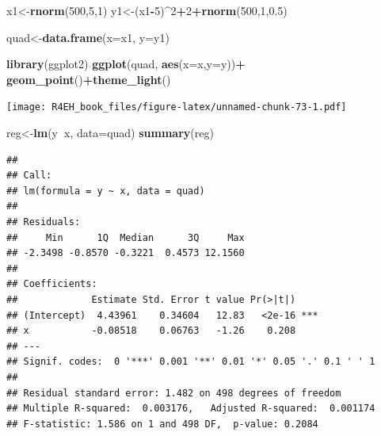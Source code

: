 \documentclass[]{book}
\newenvironment{Shaded}{\begin{snugshade}}{\end{snugshade}}
\newcommand{\KeywordTok}[1]{\textcolor[rgb]{0.13,0.29,0.53}{\textbf{#1}}}
\newcommand{\DataTypeTok}[1]{\textcolor[rgb]{0.13,0.29,0.53}{#1}}
\newcommand{\DecValTok}[1]{\textcolor[rgb]{0.00,0.00,0.81}{#1}}
\newcommand{\FloatTok}[1]{\textcolor[rgb]{0.00,0.00,0.81}{#1}}
\newcommand{\StringTok}[1]{\textcolor[rgb]{0.31,0.60,0.02}{#1}}
\newcommand{\OperatorTok}[1]{\textcolor[rgb]{0.81,0.36,0.00}{\textbf{#1}}}
\newcommand{\NormalTok}[1]{#1}
\theoremstyle{definition}
\theoremstyle{definition}
\theoremstyle{definition}
\theoremstyle{remark}
\begin{document}
\begin{Shaded}
\begin{Highlighting}[]
\NormalTok{x1<-}\KeywordTok{rnorm}\NormalTok{(}\DecValTok{500}\NormalTok{,}\DecValTok{5}\NormalTok{,}\DecValTok{1}\NormalTok{)}
\NormalTok{y1<-(x1}\OperatorTok{-}\DecValTok{5}\NormalTok{)}\OperatorTok{^}\DecValTok{2}\OperatorTok{+}\DecValTok{2}\OperatorTok{+}\KeywordTok{rnorm}\NormalTok{(}\DecValTok{500}\NormalTok{,}\DecValTok{1}\NormalTok{,}\FloatTok{0.5}\NormalTok{)}

\NormalTok{quad<-}\KeywordTok{data.frame}\NormalTok{(}\DataTypeTok{x=}\NormalTok{x1,}
                 \DataTypeTok{y=}\NormalTok{y1)}
\end{Highlighting}
\end{Shaded}

\begin{Shaded}
\begin{Highlighting}[]
\KeywordTok{library}\NormalTok{(ggplot2)}
\KeywordTok{ggplot}\NormalTok{(quad, }\KeywordTok{aes}\NormalTok{(}\DataTypeTok{x=}\NormalTok{x,}\DataTypeTok{y=}\NormalTok{y))}\OperatorTok{+}
\StringTok{  }\KeywordTok{geom_point}\NormalTok{()}\OperatorTok{+}\KeywordTok{theme_light}\NormalTok{()}
\end{Highlighting}
\end{Shaded}

\texttt{[image: R4EH\_book\_files/figure-latex/unnamed-chunk-73-1.pdf]}

\begin{Shaded}
\begin{Highlighting}[]
\NormalTok{reg<-}\KeywordTok{lm}\NormalTok{(y}\OperatorTok{~}\NormalTok{x, }\DataTypeTok{data=}\NormalTok{quad)}
\KeywordTok{summary}\NormalTok{(reg)}
\end{Highlighting}
\end{Shaded}

\begin{verbatim}
## 
## Call:
## lm(formula = y ~ x, data = quad)
## 
## Residuals:
##     Min      1Q  Median      3Q     Max 
## -2.3498 -0.8570 -0.3221  0.4573 12.1560 
## 
## Coefficients:
##             Estimate Std. Error t value Pr(>|t|)    
## (Intercept)  4.43961    0.34604   12.83   <2e-16 ***
## x           -0.08518    0.06763   -1.26    0.208    
## ---
## Signif. codes:  0 '***' 0.001 '**' 0.01 '*' 0.05 '.' 0.1 ' ' 1
## 
## Residual standard error: 1.482 on 498 degrees of freedom
## Multiple R-squared:  0.003176,   Adjusted R-squared:  0.001174 
## F-statistic: 1.586 on 1 and 498 DF,  p-value: 0.2084
\end{verbatim}
\end{document}
